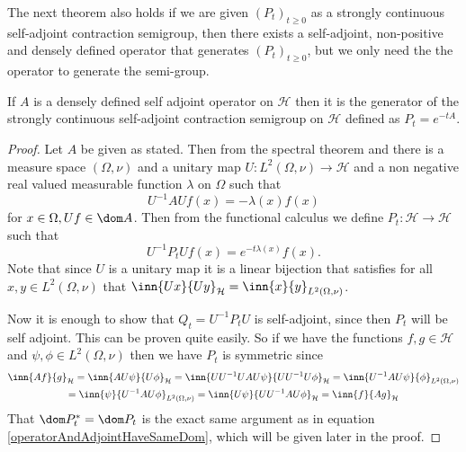 The next theorem also holds if we are given $(P_t)_{t \geq 0}$ as a strongly continuous self-adjoint contraction semigroup, then there exists a self-adjoint, non-positive and densely defined operator that generates $(P_t)_{t \geq 0}$, but we only need the the operator to generate the semi-group.
\begin{theorem}\label{genSemigroup}
	If $A$ is a densely defined self adjoint operator on $\mathcal{H}$ then it is the generator of the strongly continuous self-adjoint contraction semigroup on $\mathcal{H}$ defined as $P_t = e^{-tA}$.
\end{theorem}
\begin{proof}
	
	Let $A$ be given as stated. Then from the spectral theorem \cite[theorem 1.1.2]{fabriceDirichelt} and there is a measure space $(\Omega, \nu)$ and a unitary map $U: L^2(\Omega, \nu) \to \mathcal{H}$ and a non negative real valued measurable function $\lambda$ on $\Omega$ such that
	\begin{equation}
		U^{-1}AUf(x) = -\lambda(x)f(x)
	\end{equation}
	for $x \in \Omega, U f \in \dom A$. Then from the functional calculus \cite[theorem 1.1.3]{fabriceDirichelt} we define $P_t: \mathcal{H} \to \mathcal{H}$ such that
	\begin{equation}
				U^{-1}P_tUf(x) = e^{-t \lambda(x)}f(x).
	\end{equation}
	Note that since $U$ is a unitary map it is a linear bijection that satisfies for all $x,y \in L^2(\Omega, \nu)$ that $\inn{Ux}{Uy}_{\mathcal{H}} = \inn{x}{y}_{L^2(\Omega, \nu)}$.
	
	Now it is enough to show that $Q_t = U^{-1}P_t U$ is self-adjoint, since then $P_t$ will be self adjoint. This can be proven quite easily. So if we have the functions $f, g \in \mathcal{H}$ and $\psi, \phi \in L^{2}(\Omega, \nu)$ then we have $P_t$ is symmetric since
	\begin{multline}
	\inn{Af}{g}_{\mathcal{H}} = \inn{AU\psi}{U\phi}_{\mathcal{H}} = \inn{UU^{-1}UAU\psi}{UU^{-1}U\phi}_{\mathcal{H}} = \inn{U^{-1}AU \psi}{\phi}_{L^2(\Omega, \nu)} \\
	=  \inn{\psi}{U^{-1}AU \phi}_{L^2(\Omega, \nu)} = \inn{U\psi}{UU^{-1}AU\phi}_{\mathcal{H}} = \inn{f}{Ag}_{\mathcal{H}}
	\end{multline}
	That $\dom P_t^{*} = \dom P_t$ is the exact same argument as in equation \ref{operatorAndAdjointHaveSameDom}, which will be given later in the proof.
	

\end{proof}
